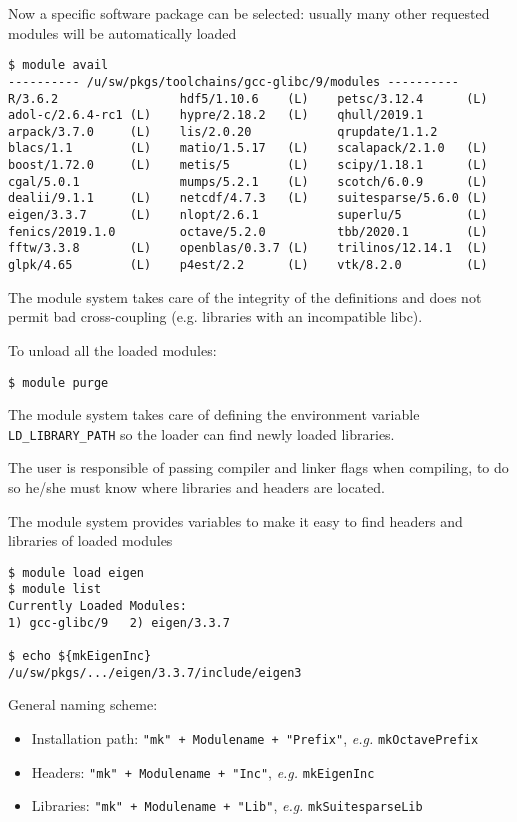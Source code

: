 \documentclass[10pt]{beamer}
\begin{document}
\begin{frame}[fragile]
\small
Now a specific software package can be selected: usually many other requested modules will be automatically loaded
\begin{verbatim}
$ module avail
---------- /u/sw/pkgs/toolchains/gcc-glibc/9/modules ----------
R/3.6.2                 hdf5/1.10.6    (L)    petsc/3.12.4      (L)
adol-c/2.6.4-rc1 (L)    hypre/2.18.2   (L)    qhull/2019.1
arpack/3.7.0     (L)    lis/2.0.20            qrupdate/1.1.2
blacs/1.1        (L)    matio/1.5.17   (L)    scalapack/2.1.0   (L)
boost/1.72.0     (L)    metis/5        (L)    scipy/1.18.1      (L)
cgal/5.0.1              mumps/5.2.1    (L)    scotch/6.0.9      (L)
dealii/9.1.1     (L)    netcdf/4.7.3   (L)    suitesparse/5.6.0 (L)
eigen/3.3.7      (L)    nlopt/2.6.1           superlu/5         (L)
fenics/2019.1.0         octave/5.2.0          tbb/2020.1        (L)
fftw/3.3.8       (L)    openblas/0.3.7 (L)    trilinos/12.14.1  (L)
glpk/4.65        (L)    p4est/2.2      (L)    vtk/8.2.0         (L)
\end{verbatim}

The module system takes care of the integrity of the definitions and does not permit bad cross-coupling (e.g. libraries with an incompatible libc).\smallskip

To unload all the loaded modules:
\begin{verbatim}
$ module purge
\end{verbatim}
\end{frame}


\begin{frame}[fragile]

The module system takes care of defining the environment variable \texttt{LD\_LIBRARY\_PATH} so the loader can find newly loaded libraries.

The user is responsible of passing compiler and linker flags when compiling, to do so he/she must know where libraries and headers are located.

The module system provides variables to make it easy to find headers and libraries of loaded modules

\begin{verbatim}
$ module load eigen
$ module list
Currently Loaded Modules:
1) gcc-glibc/9   2) eigen/3.3.7

$ echo ${mkEigenInc}
/u/sw/pkgs/.../eigen/3.3.7/include/eigen3
\end{verbatim}

General naming scheme: 
\begin{itemize}
\item Installation path: {\tt "mk" + Modulename + "Prefix"}, {\it e.g.} {\tt mkOctavePrefix}
\item Headers: {\tt "mk" + Modulename + "Inc"}, {\it e.g.} {\tt mkEigenInc}
\item Libraries: {\tt "mk" + Modulename + "Lib"}, {\it e.g.} {\tt mkSuitesparseLib}
\end{itemize}
\end{frame}
\end{document}
